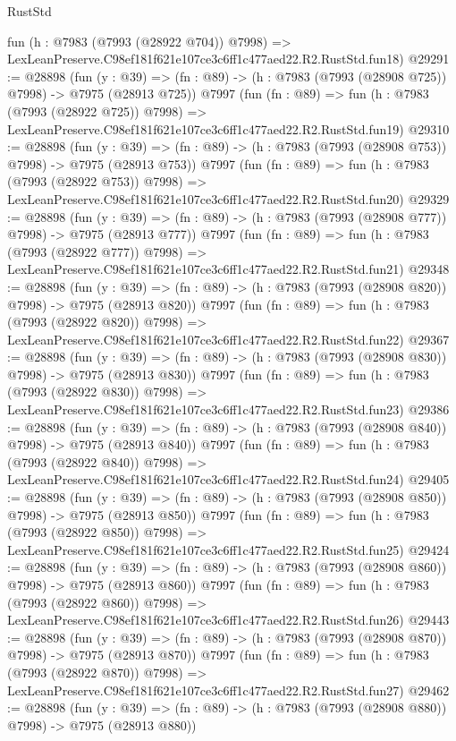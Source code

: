 \begin{lexlean}{RustStd}
\begin{coremodule}
    fun (h : @7983 (@7993 (@28922 @704)) @7998) =>
    LexLeanPreserve.C98ef181f621e107ce3c6ff1c477aed22.R2.RustStd.fun18)
@29291 := @28898
    (fun (y : @39) => (fn : @89) -> (h : @7983 (@7993 (@28908 @725)) @7998) -> @7975 (@28913 @725))
    @7997
    (fun (fn : @89) =>
    fun (h : @7983 (@7993 (@28922 @725)) @7998) =>
    LexLeanPreserve.C98ef181f621e107ce3c6ff1c477aed22.R2.RustStd.fun19)
@29310 := @28898
    (fun (y : @39) => (fn : @89) -> (h : @7983 (@7993 (@28908 @753)) @7998) -> @7975 (@28913 @753))
    @7997
    (fun (fn : @89) =>
    fun (h : @7983 (@7993 (@28922 @753)) @7998) =>
    LexLeanPreserve.C98ef181f621e107ce3c6ff1c477aed22.R2.RustStd.fun20)
@29329 := @28898
    (fun (y : @39) => (fn : @89) -> (h : @7983 (@7993 (@28908 @777)) @7998) -> @7975 (@28913 @777))
    @7997
    (fun (fn : @89) =>
    fun (h : @7983 (@7993 (@28922 @777)) @7998) =>
    LexLeanPreserve.C98ef181f621e107ce3c6ff1c477aed22.R2.RustStd.fun21)
@29348 := @28898
    (fun (y : @39) => (fn : @89) -> (h : @7983 (@7993 (@28908 @820)) @7998) -> @7975 (@28913 @820))
    @7997
    (fun (fn : @89) =>
    fun (h : @7983 (@7993 (@28922 @820)) @7998) =>
    LexLeanPreserve.C98ef181f621e107ce3c6ff1c477aed22.R2.RustStd.fun22)
@29367 := @28898
    (fun (y : @39) => (fn : @89) -> (h : @7983 (@7993 (@28908 @830)) @7998) -> @7975 (@28913 @830))
    @7997
    (fun (fn : @89) =>
    fun (h : @7983 (@7993 (@28922 @830)) @7998) =>
    LexLeanPreserve.C98ef181f621e107ce3c6ff1c477aed22.R2.RustStd.fun23)
@29386 := @28898
    (fun (y : @39) => (fn : @89) -> (h : @7983 (@7993 (@28908 @840)) @7998) -> @7975 (@28913 @840))
    @7997
    (fun (fn : @89) =>
    fun (h : @7983 (@7993 (@28922 @840)) @7998) =>
    LexLeanPreserve.C98ef181f621e107ce3c6ff1c477aed22.R2.RustStd.fun24)
@29405 := @28898
    (fun (y : @39) => (fn : @89) -> (h : @7983 (@7993 (@28908 @850)) @7998) -> @7975 (@28913 @850))
    @7997
    (fun (fn : @89) =>
    fun (h : @7983 (@7993 (@28922 @850)) @7998) =>
    LexLeanPreserve.C98ef181f621e107ce3c6ff1c477aed22.R2.RustStd.fun25)
@29424 := @28898
    (fun (y : @39) => (fn : @89) -> (h : @7983 (@7993 (@28908 @860)) @7998) -> @7975 (@28913 @860))
    @7997
    (fun (fn : @89) =>
    fun (h : @7983 (@7993 (@28922 @860)) @7998) =>
    LexLeanPreserve.C98ef181f621e107ce3c6ff1c477aed22.R2.RustStd.fun26)
@29443 := @28898
    (fun (y : @39) => (fn : @89) -> (h : @7983 (@7993 (@28908 @870)) @7998) -> @7975 (@28913 @870))
    @7997
    (fun (fn : @89) =>
    fun (h : @7983 (@7993 (@28922 @870)) @7998) =>
    LexLeanPreserve.C98ef181f621e107ce3c6ff1c477aed22.R2.RustStd.fun27)
@29462 := @28898
    (fun (y : @39) => (fn : @89) -> (h : @7983 (@7993 (@28908 @880)) @7998) -> @7975 (@28913 @880))

\end{coremodule}
\end{lexlean}
